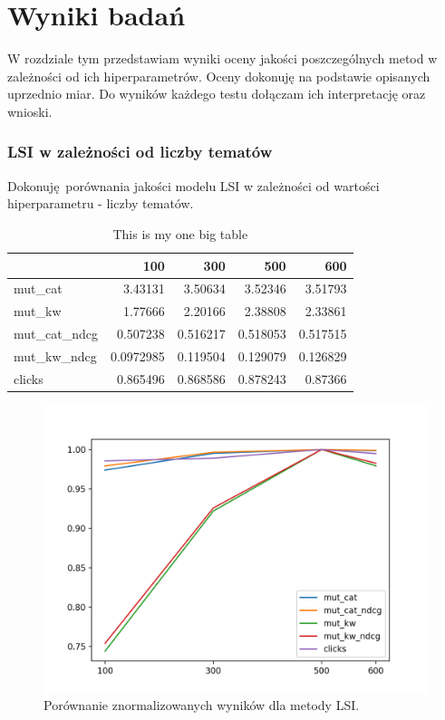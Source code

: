 \documentclass[pl]{minipw} %
\begin{document}
\chapter{Wyniki badań}
W rozdziale tym przedstawiam wyniki oceny jakości poszczególnych metod w zależności od ich hiperparametrów. Oceny dokonuję na podstawie opisanych uprzednio miar. Do wyników każdego testu dołączam ich interpretację oraz wnioski.

\subsection{LSI w zależności od liczby tematów}

Dokonuję porównania jakości modelu LSI w zależności od wartości hiperparametru - liczby tematów.

\begin{table}
	\centering
	\begin{tabular}{lrrrr}
		\hline
		&       100 &      300 &      500 &      600 \\
		\hline
		mut\_cat      & 3.43131   & 3.50634  & 3.52346  & 3.51793  \\
		mut\_kw       & 1.77666   & 2.20166  & 2.38808  & 2.33861  \\
		mut\_cat\_ndcg & 0.507238  & 0.516217 & 0.518053 & 0.517515 \\
		mut\_kw\_ndcg  & 0.0972985 & 0.119504 & 0.129079 & 0.126829 \\
		clicks       & 0.865496  & 0.868586 & 0.878243 & 0.87366  \\
		\hline
	\end{tabular}
	\caption{This is my one big table}
\end{table}

\begin{figure}[H]
	\centering
	\includegraphics[width=1\textwidth]{img/results/lsi.png}
	\caption{Porównanie znormalizowanych wyników dla metody LSI.}
\end{figure}
\end{document}

